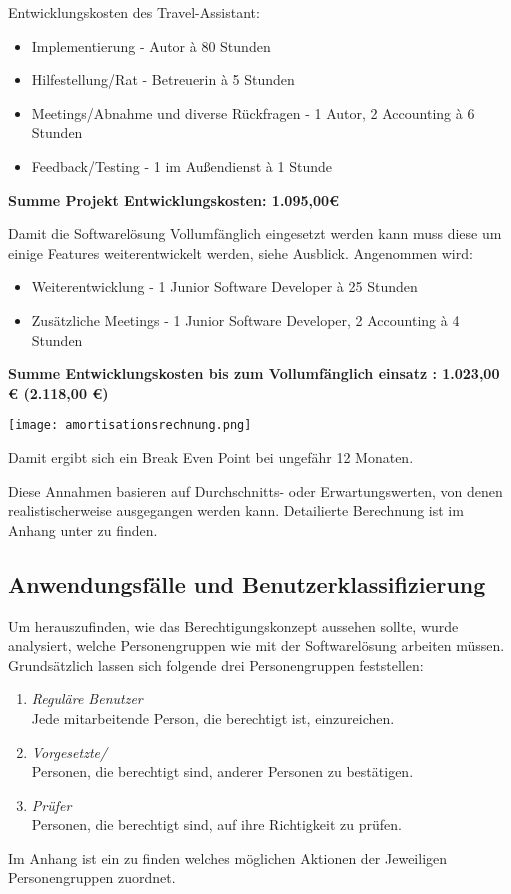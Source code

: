Entwicklungskosten des Travel-Assistant:
\begin{itemize}

\item Implementierung - Autor à 80 Stunden
\item Hilfestellung/Rat - Betreuerin à 5 Stunden 
\item Meetings/Abnahme und diverse Rückfragen - 1 Autor, 2  Accounting à 6 Stunden
\item Feedback/Testing - 1  im Außendienst à 1 Stunde
\end{itemize}

\textbf{Summe Projekt Entwicklungskosten: 1.095,00€}

Damit die Softwarelösung Vollumfänglich eingesetzt werden kann muss diese um einige Features weiterentwickelt werden, siehe Ausblick. Angenommen wird:
\begin{itemize}
\item Weiterentwicklung - 1 Junior Software Developer à 25 Stunden
\item Zusätzliche Meetings - 1 Junior Software Developer, 2  Accounting à 4 Stunden
\end{itemize}

\textbf{Summe Entwicklungskosten bis zum Vollumfänglich einsatz : 1.023,00 € (2.118,00 €)}

\texttt{[image: amortisationsrechnung.png]}

Damit ergibt sich ein Break Even Point bei ungefähr 12 Monaten.

Diese Annahmen basieren auf Durchschnitts- oder Erwartungswerten, von denen realistischerweise ausgegangen werden kann.
Detailierte Berechnung ist im Anhang unter  zu finden.

\subsection{Anwendungsfälle und Benutzerklassifizierung}
\label{sec:Analysephase:Benutzerklassifizierung}

Um herauszufinden, wie das Berechtigungskonzept aussehen sollte, wurde analysiert, welche Personengruppen wie mit der Softwarelösung arbeiten müssen.
Grundsätzlich lassen sich folgende drei Personengruppen feststellen:

\begin{enumerate}
    \item \emph{Reguläre Benutzer}\\
    Jede mitarbeitende Person, die berechtigt ist,  einzureichen.
    \item \emph{Vorgesetzte/}\\
    Personen, die berechtigt sind,  anderer Personen zu bestätigen.
    \item \emph{Prüfer}\\
    Personen, die berechtigt sind,  auf ihre Richtigkeit zu prüfen.
\end{enumerate}

Im Anhang ist ein  zu finden welches möglichen Aktionen der Jeweiligen Personengruppen zuordnet.